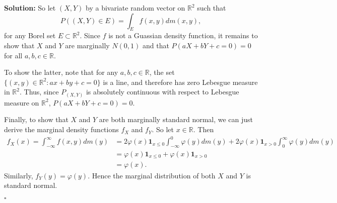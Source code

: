 \documentclass[12pt]{article}
\newcounter{ProofCounter}
\newenvironment{Solution}{\stepcounter{ProofCounter}\textbf{Solution:}}{\hfill$\square$}
\begin{document}
\begin{Solution}
  So let $(X, Y)$ by a bivariate random vector on $\mathbb{R}^2$ such that
  \[
    P((X, Y) \in E) = \int_{E} f(x,y) dm(x, y),
  \]
  for any Borel set $E \subset \mathbb{R}^2$.
  Since $f$ is not a Guassian density function, it remains to show that $X$ and $Y$ are marginally $N(0, 1)$ and that $P(a X + b Y + c = 0) = 0$ for all $a, b, c \in \mathbb{R}$.
  
  To show the latter, note that for any $a, b, c \in \mathbb{R}$, the set $\{ (x, y) \in \mathbb{R}^2 : ax + by + c = 0 \}$ is a line, and therefore has zero Lebesgue measure in $\mathbb{R}^2$. Thus, since $P_{(X, Y)}$ is absolutely continuous with respect to Lebesgue measure on $\mathbb{R}^2$, $P(a X + b Y + c = 0) = 0$.
  
  Finally, to show that $X$ and $Y$ are both marginally standard normal, we can just derive the marginal density functions $f_X$ and $f_Y$. So let $x \in \mathbb{R}$.
  Then
  \begin{align*}
    f_X(x) = \int_{-\infty}^{\infty} f(x, y) dm(y) & = 2 \varphi(x) \bm{1}_{x \leq 0}\int_{-\infty}^{0} \varphi(y) dm(y) + 2\varphi(x) \bm{1}_{x > 0} \int_{0}^{\infty} \varphi(y)dm(y) \\
    & = \varphi(x) \bm{1}_{x \leq 0} + \varphi(x) \bm{1}_{x > 0}  \\
    & = \varphi(x).
  \end{align*}
  Similarly, $f_Y(y) = \varphi(y)$. Hence the marginal distribution of both $X$ and $Y$ is standard normal.
  
\end{Solution}
\end{document}
